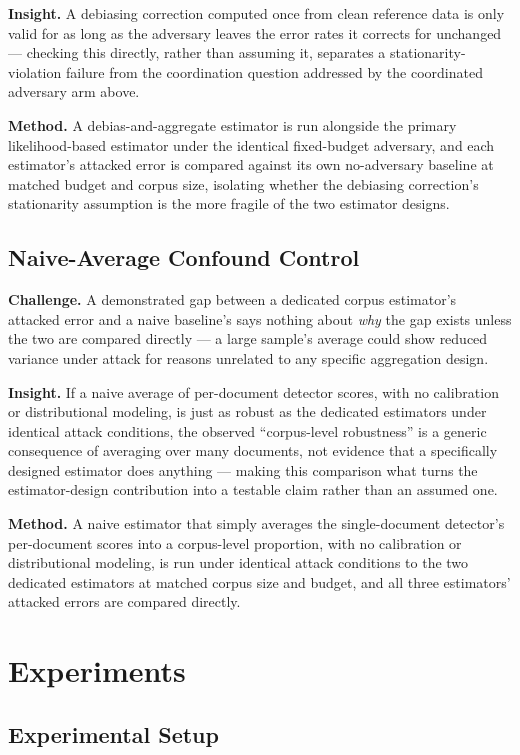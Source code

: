\documentclass[11pt]{article}
\begin{document}
\textbf{Insight.} A debiasing correction computed once from clean reference data is only valid for as long as the adversary leaves the error rates it corrects for unchanged --- checking this directly, rather than assuming it, separates a stationarity-violation failure from the coordination question addressed by the coordinated adversary arm above.

\textbf{Method.} A debias-and-aggregate estimator is run alongside the primary likelihood-based estimator under the identical fixed-budget adversary, and each estimator's attacked error is compared against its own no-adversary baseline at matched budget and corpus size, isolating whether the debiasing correction's stationarity assumption is the more fragile of the two estimator designs.

\subsection{Naive-Average Confound Control}
\textbf{Challenge.} A demonstrated gap between a dedicated corpus estimator's attacked error and a naive baseline's says nothing about \emph{why} the gap exists unless the two are compared directly --- a large sample's average could show reduced variance under attack for reasons unrelated to any specific aggregation design.

\textbf{Insight.} If a naive average of per-document detector scores, with no calibration or distributional modeling, is just as robust as the dedicated estimators under identical attack conditions, the observed ``corpus-level robustness'' is a generic consequence of averaging over many documents, not evidence that a specifically designed estimator does anything --- making this comparison what turns the estimator-design contribution into a testable claim rather than an assumed one.

\textbf{Method.} A naive estimator that simply averages the single-document detector's per-document scores into a corpus-level proportion, with no calibration or distributional modeling, is run under identical attack conditions to the two dedicated estimators at matched corpus size and budget, and all three estimators' attacked errors are compared directly.

\section{Experiments}

\subsection{Experimental Setup}
\end{document}
